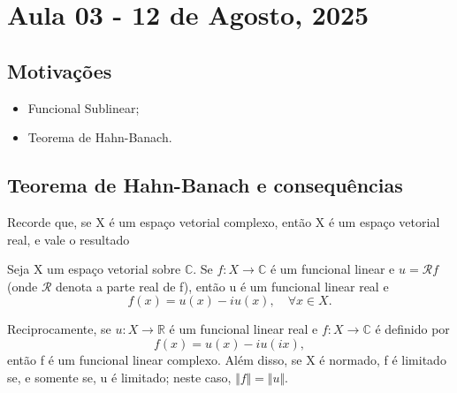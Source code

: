 \documentclass[../functional_analysis.tex]{subfiles}
\begin{document}
\section{Aula 03 - 12 de Agosto, 2025}
\subsection{Motivações}
\begin{itemize}
	\item Funcional Sublinear;
	\item Teorema de Hahn-Banach.
\end{itemize}
\subsection{Teorema de Hahn-Banach e consequências}
Recorde que, se X é um espaço vetorial complexo, então X é um espaço vetorial real, e vale o resultado
\begin{prop*}
	Seja X um espaço vetorial sobre \(\mathbb{C}.\) Se \(f:X\rightarrow \mathbb{C}\) é um funcional linear e \(u= \mathcal{R}f\) (onde \(\mathcal{R}\) denota a parte real de f), então u é um funcional linear real e
	\[
		f(x)=u(x)-iu(x),\quad \forall x\in X.
	\]

	Reciprocamente, se \(u:X\rightarrow \mathbb{R}\) é um funcional linear real e \(f:X\rightarrow \mathbb{C}\) é definido por
	\[
		f(x)=u(x)-iu(ix),
	\]
	então f é um funcional linear complexo. Além disso, se X é normado, f é limitado se, e somente se, u é limitado; neste caso, \(\Vert f \Vert = \Vert u \Vert.\)
\end{prop*}
\end{document}
